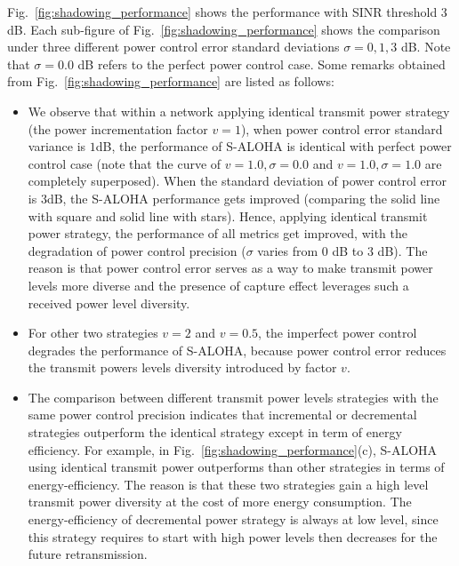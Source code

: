 Fig.~\ref{fig:shadowing_performance} shows the performance with SINR threshold $3$dB. Each sub-figure of Fig.~\ref{fig:shadowing_performance} shows the comparison under three different power control error standard deviations $\sigma = 0, 1, 3$ dB. Note that $\sigma = 0.0$ dB refers to the perfect power control case. Some remarks obtained from Fig.~\ref{fig:shadowing_performance} are listed as follows:
\begin{itemize}[leftmargin=*, noitemsep]
	\item We observe that within a network applying identical transmit power strategy (the power incrementation factor $v=1$), when power control error standard variance is $1$dB, the performance of S-ALOHA is identical with perfect power control case (note that the curve of $v=1.0, \sigma=0.0$ and $v=1.0, \sigma=1.0$ are completely superposed). When the standard deviation of power control error is $3$dB, the S-ALOHA performance gets improved (comparing the solid line with square and solid line with stars). 
	Hence, applying identical transmit power strategy, the performance of all metrics get improved, with the degradation of power control precision ($\sigma$ varies from $0$ dB to $3$ dB). The reason is that power control error serves as a way to make transmit power levels more diverse and the presence of capture effect leverages such a received power level diversity.
	\item For other two strategies $v=2$ and $v=0.5$, the imperfect power control degrades the performance of S-ALOHA, because power control error reduces the transmit powers levels diversity introduced by factor $v$. 
	\item The comparison between different transmit power levels strategies with the same power control precision indicates that incremental or decremental strategies outperform the identical strategy except in term of energy efficiency. For example, in Fig.~\ref{fig:shadowing_performance}(c), S-ALOHA using identical transmit power outperforms than other strategies in terms of energy-efficiency. The reason is that these two strategies gain a high level transmit power diversity at the cost of more energy consumption. The energy-efficiency of decremental power strategy is always at low level, since this strategy requires to start with high power levels then decreases for the future retransmission.  
\end{itemize}

